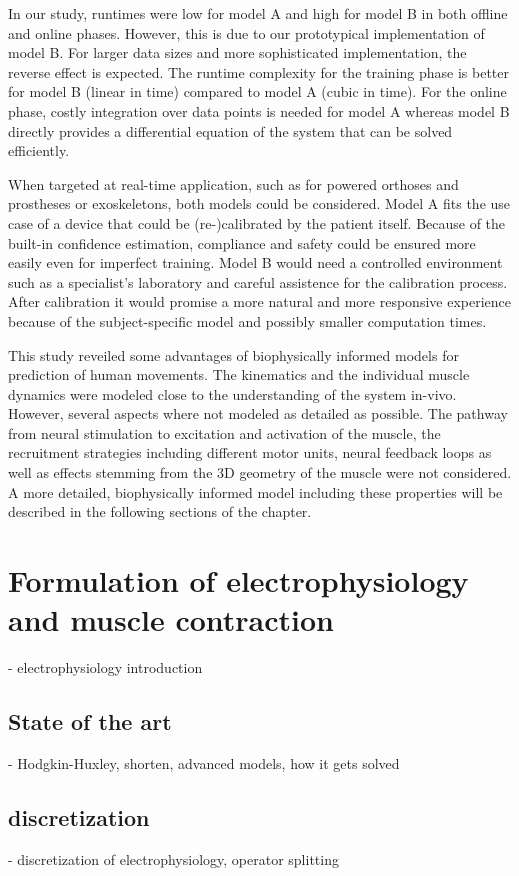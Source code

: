 In our study, runtimes were low for model A and high for model B in both offline and online phases. However, this is due to our prototypical implementation of model B. For larger data sizes and more sophisticated implementation, the reverse effect is expected. The runtime complexity for the training phase is better for model B (linear in time) compared to model A (cubic in time). For the online phase, costly integration over data points is needed for model A whereas model B directly provides a differential equation of the system that can be solved efficiently. 

When targeted at real-time application, such as for powered orthoses and prostheses or exoskeletons, both models could be considered. Model A fits the use case of a device that could be (re-)calibrated by the patient itself. Because of the built-in confidence estimation, compliance and safety could be ensured more easily even for imperfect training.
Model B would need a controlled environment such as a specialist's laboratory and careful assistence for the calibration process.
After calibration it would promise a more natural and more responsive experience because of the subject-specific model and possibly smaller computation times.

This study reveiled some advantages of biophysically informed models for prediction of human movements. The kinematics and the individual muscle dynamics were modeled close to the understanding of the system in-vivo. However, several aspects where not modeled as detailed as possible. The pathway from neural stimulation to excitation and activation of the muscle, the recruitment strategies including different motor units, neural feedback loops as well as effects stemming from the 3D geometry of the muscle were not considered. A more detailed, biophysically informed model including these properties will be described in the following sections of the chapter.


  \chapter{Formulation of electrophysiology and muscle contraction}
    - electrophysiology introduction
    \section{State of the art}
    - Hodgkin-Huxley, shorten, advanced models, how it gets solved
    \section{discretization}
    - discretization of electrophysiology, operator splitting

